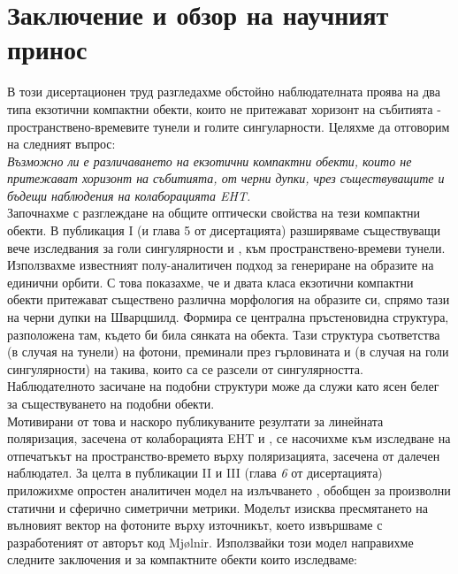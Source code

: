 \documentclass[12pt]{article}
\numberwithin{equation}{section}
\numberwithin{figure}{section}
\begin{document}
\section{Заключение и обзор на научният принос}
	
	
	В този дисертационен труд разгледахме обстойно наблюдателната проява на два типа екзотични компактни обекти, които не притежават хоризонт на събитията - пространствено-времевите тунели и голите сингуларности. Целяхме да отговорим на следният въпрос:\\
	
	\emph{Възможно ли е различаването на екзотични компактни обекти, които не притежават хоризонт на събитията, от черни дупки, чрез съществуващите и бъдещи наблюдения на колаборацията EHT.}\\
	
	Започнахме с разглеждане на общите оптически свойства на тези компактни обекти. В публикация I (и глава 5 от дисертацията) разширяваме съществуващи вече изследвания за голи сингулярности \cite{Gyulchev2020} и \cite{Gyulchev2021}, към пространствено-времеви тунели. Използвахме известният полу-аналитичен подход \cite{Muller2009} за генериране на образите на единични орбити. С това показахме, че и двата класа екзотични компактни обекти притежават съществено различна морфология на образите си, спрямо тази на черни дупки на Шварцшилд. Формира се централна пръстеновидна структура, разположена там, където би била сянката на обекта. Тази структура съответства (в случая на тунели) на фотони, преминали през гърловината и (в случая на голи сингулярности) на такива, които са се разсели от сингулярността. Наблюдателното засичане на подобни структури може да служи като ясен белег за съществуването на подобни обекти.\\
	
	Мотивирани от това и наскоро публикуваните резултати за линейната поляризация, засечена от колаборацията EHT \cite{EHT_M87_VII} и \cite{EHT_M87_VIII}, се насочихме към изследване на отпечатъкът на пространство-времето върху поляризацията, засечена от далечен наблюдател. За целта в публикации II и III (глава \emph{6} от дисертацията) приложихме опростен аналитичен модел на излъчването \cite{Narayan2021}, обобщен за произволни статични и сферично симетрични метрики. Моделът изисква пресмятането на вълновият вектор на фотоните върху източникът, което извършваме с разработеният от авторът код Mjølnir. Използвайки този модел направихме следните заключения и за компактните обекти които изследваме:\\
	
\end{document}
